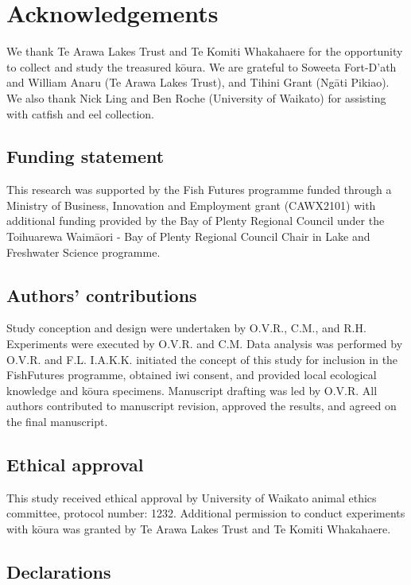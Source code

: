 \documentclass[
  12pt,
  a4paper,
  oneside]{scrbook}
\begin{document}
\section{Acknowledgements}\label{acknowledgements-1}

We thank Te Arawa Lakes Trust and Te Komiti Whakahaere for the
opportunity to collect and study the treasured kōura. We are grateful to
Soweeta Fort-D'ath and William Anaru (Te Arawa Lakes Trust), and Tihini
Grant (Ngāti Pikiao). We also thank Nick Ling and Ben Roche (University
of Waikato) for assisting with catfish and eel collection.

\subsection{Funding statement}\label{funding-statement}

This research was supported by the Fish Futures programme funded through
a Ministry of Business, Innovation and Employment grant (CAWX2101) with
additional funding provided by the Bay of Plenty Regional Council under
the Toihuarewa Waimāori - Bay of Plenty Regional Council Chair in Lake
and Freshwater Science programme.

\subsection{Authors' contributions}\label{authors-contributions}

Study conception and design were undertaken by O.V.R., C.M., and R.H.
Experiments were executed by O.V.R. and C.M. Data analysis was performed
by O.V.R. and F.L. I.A.K.K. initiated the concept of this study for
inclusion in the FishFutures programme, obtained iwi consent, and
provided local ecological knowledge and kōura specimens. Manuscript
drafting was led by O.V.R. All authors contributed to manuscript
revision, approved the results, and agreed on the final manuscript.

\subsection{Ethical approval}\label{ethical-approval}

This study received ethical approval by University of Waikato animal
ethics committee, protocol number: 1232. Additional permission to
conduct experiments with kōura was granted by Te Arawa Lakes Trust and
Te Komiti Whakahaere.

\subsection{Declarations}\label{declarations}
\end{document}
